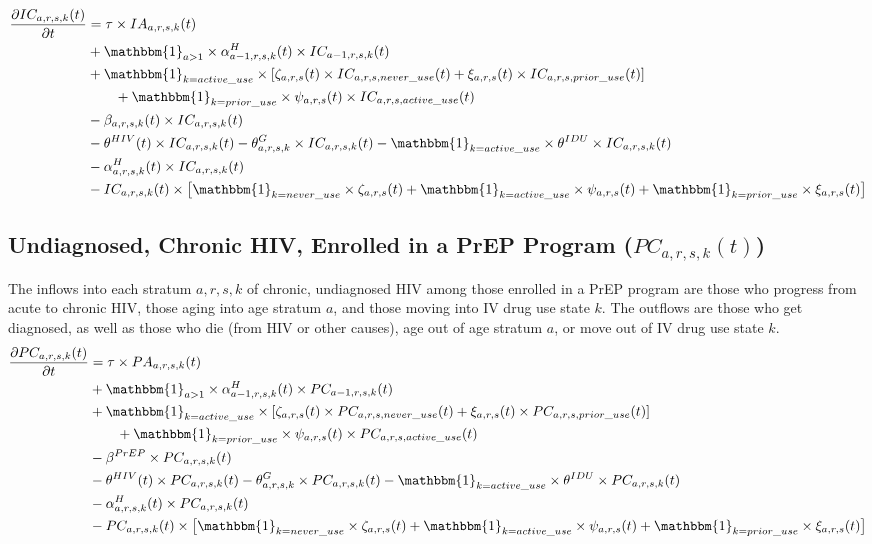 \documentclass{article}
\begin{document}
\begin{align*}
\frac{\partial IC_{a,r,s,k}(t)}{\partial t} 
&= \tau \times IA_{a,r,s,k}(t) \\
&+ \mathbbm{1}_{a>1} \times \alpha_{a-1,r,s,k}^H(t) \times IC_{a-1,r,s,k}(t) \\
&+ \mathbbm{1}_{k=active\_use} \times [\zeta_{a,r,s}(t) \times IC_{a,r,s,never\_use}(t) + \xi_{a,r,s}(t) \times IC_{a,r,s,prior\_use}(t)]\\
&\qquad + \mathbbm{1}_{k=prior\_use} \times \psi_{a,r,s}(t) \times IC_{a,r,s,active\_use}(t)\\
&- \beta_{a,r,s,k}(t) \times IC_{a,r,s,k}(t) \\
&- \theta^{HIV}(t) \times IC_{a,r,s,k}(t)  
- \theta^G_{a,r,s,k} \times IC_{a,r,s,k}(t) 
- \mathbbm{1}_{k=active\_use} \times \theta^{IDU} \times IC_{a,r,s,k}(t) \\
&- \alpha_{a,r,s,k}^H(t) \times IC_{a,r,s,k}(t) \\
&- IC_{a,r,s,k}(t) \times \big[\mathbbm{1}_{k=never\_use} \times \zeta_{a,r,s}(t) + \mathbbm{1}_{k=active\_use} \times \psi_{a,r,s}(t) + \mathbbm{1}_{k=prior\_use} \times \xi_{a,r,s}(t)\big]
\end{align*}

\subsection{Undiagnosed, Chronic HIV, Enrolled in a PrEP Program \big($PC_{a,r,s,k}(t)$\big)}

The inflows into each stratum $a,r,s,k$ of chronic, undiagnosed HIV among those enrolled in a PrEP program are those who progress from acute to chronic HIV, those aging into age stratum $a$, and those moving into IV drug use state $k$. The outflows are those who get diagnosed, as well as those who die (from HIV or other causes), age out of age stratum $a$, or move out of IV drug use state $k$.
\begin{align*}
\frac{\partial PC_{a,r,s,k}(t)}{\partial t} 
&= \tau \times PA_{a,r,s,k}(t) \\
&+ \mathbbm{1}_{a>1} \times \alpha_{a-1,r,s,k}^H(t) \times PC_{a-1,r,s,k}(t) \\
&+ \mathbbm{1}_{k=active\_use} \times [\zeta_{a,r,s}(t) \times PC_{a,r,s,never\_use}(t) + \xi_{a,r,s}(t) \times PC_{a,r,s,prior\_use}(t)]\\
&\qquad + \mathbbm{1}_{k=prior\_use} \times \psi_{a,r,s}(t) \times PC_{a,r,s,active\_use}(t)\\
&- \beta^{PrEP} \times PC_{a,r,s,k}(t) \\
&- \theta^{HIV}(t) \times PC_{a,r,s,k}(t)  
- \theta^G_{a,r,s,k} \times PC_{a,r,s,k}(t) 
- \mathbbm{1}_{k=active\_use} \times \theta^{IDU} \times PC_{a,r,s,k}(t) \\
&- \alpha_{a,r,s,k}^H(t) \times PC_{a,r,s,k}(t) \\
&- PC_{a,r,s,k}(t) \times \big[\mathbbm{1}_{k=never\_use} \times \zeta_{a,r,s}(t) + \mathbbm{1}_{k=active\_use} \times \psi_{a,r,s}(t) + \mathbbm{1}_{k=prior\_use} \times \xi_{a,r,s}(t)\big]
\end{align*}
\end{document}
